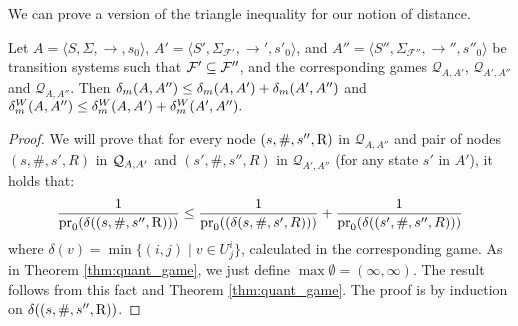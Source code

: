 We can prove a version of the triangle inequality for our notion of distance. 
%
\begin{thm} \label{thm:triang_ineq}
  Let $A = \langle S, \Sigma, \rightarrow, s_0 \rangle$, $A' = \langle S', \Sigma_{\mathcal{F'}}, \rightarrow', s'_0 \rangle$,  and  $A'' = \langle S'', \Sigma_{\mathcal{F''}},\rightarrow'', s''_0 \rangle$ be transition systems such that $\mathcal{F}' \subseteq \mathcal{F}''$, and the corresponding games $\mathcal{Q}_{A,A'}$, $\mathcal{Q}_{A',A''}$ and $\mathcal{Q}_{A,A''}$.
  Then $\delta_{m}(A,A'') \leq \delta_{m}(A,A') + \delta_{m}(A', A'')$ and
  $\delta_{m}^W(A,A'') \leq \delta_{m}^W(A,A') + \delta_{m}^W(A', A'').$
\end{thm}
\begin{proof} 
We will prove that for every node $(s,\#,s'',\mathrm{R})$ in $\mathcal{Q}_{A,A''}$ and  pair of nodes
$(s,\#, s', R)$ in $\mathcal{Q}_{A, A'}$ and $(s',\#,s'', R)$ in $\mathcal{Q}_{{A'},A''}$ (for any state $s'$ in $A'$), it holds that:
\[
\frac{1}{\operatorname{pr}_{0}(\delta((s,\#, s'', \mathrm{R})))} \leq \frac{1}{\operatorname{pr}_{0}((\delta(s,\#, s', R)))} + \frac{1}{\operatorname{pr}_{0}(\delta((s',\#, s'', R)))}
\] 
where $\delta(v) = \min \{(i,j) \mid v \in U^i_j\}$, calculated in the corresponding game. 
As in Theorem \ref{thm:quant_game}, we just define $\max \emptyset = (\infty, \infty)$. 
The result follows from this fact and Theorem \ref{thm:quant_game}. The proof is by induction on $\delta((s,\#, s'', \mathrm{R}))$.


\end{proof}
